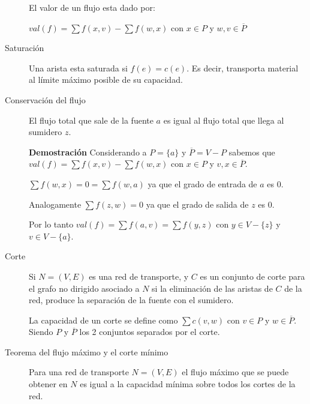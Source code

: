 \documentclass[a4paper, twoside]{article}
\begin{document}
\begin{description}
	El valor de un flujo esta dado por:

	$val(f) = \sum f(x,v) - \sum f(w,x)$ con $x \in P$ y $w,v \in \overline{P}$

	\item[Saturación] Una arista esta saturada si $f(e) = c(e)$.
	Es decir, transporta material al límite máximo posible de su capacidad.

	\item[Conservación del flujo] El flujo total que sale de la fuente $a$ es igual al flujo total que llega al sumidero $z$.

	\textbf{Demostración} Considerando a $P = \{a\}$ y $\overline{P} = V - P$ sabemos que $val(f) = \sum f(x,v) - \sum f(w,x)$ con $x \in P$ y $v,x \in \overline{P}$.
	
	$ \sum f(w,x) = 0 = \sum f(w,a)$ ya que el grado de entrada de $a$ es 0.

	Analogamente $ \sum f(z,w) = 0$ ya que el grado de salida de $z$ es 0.

	Por lo tanto $val(f) = \sum f(a,v) = \sum f(y,z)$ con $y \in V - \{z\}$ y $v \in V - \{a\}$. 

	\item[Corte] Si $N = (V,E)$ es una red de transporte, y $C$ es un conjunto de corte para el grafo no dirigido asociado a $N$ si la eliminación de las aristas de $C$ de la red, produce la separación de la fuente con el sumidero.

	La capacidad de un corte se define como $\sum c(v,w)$ con $v \in P$ y $w \in \overline{P}$.
	Siendo $P$ y $\overline{P}$ los 2 conjuntos separados por el corte.

	\item[Teorema del flujo máximo y el corte mínimo] Para una red de transporte $N = (V,E)$ el flujo máximo que se puede obtener en $N$ es igual a la capacidad mínima sobre todos los cortes de la red.
\end{description}

\end{document}

